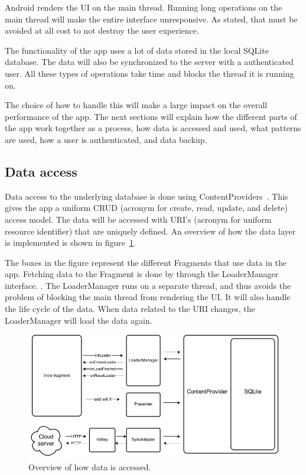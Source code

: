 Android renders the UI on the main thread. Running long operations on the main thread will make the entire interface unresponsive. As stated, that must be avoided at all cost to not destroy the user experience. 

The functionality of the app uses a lot of data stored in the local SQLite database. The data will also be synchronized to the server with a authenticated user. All these types of operations take time and blocks the thread it is running on.

The choice of how to handle this will make a large impact on the overall performance of the app. The next sections will explain how the different parts of the app work together as a process, how data is accessed and used, what patterns are used, how a user is authenticated, and data backup.


\subsection{Data access}
Data access to the underlying database is done using ContentProviders~\cite{contentproviders}. This gives the app a uniform \gls{CRUD} (acronym for create, read, update, and delete) access model. The data will be accessed with \gls{URI}'s (acronym for uniform resource identifier) that are uniquely defined. An overview of how the data layer is implemented is shown in figure~\ref{fig:archAppOverview}.

The boxes in the figure represent the different Fragments that use data in the app. Fetching data to the Fragment is done by through the LoaderManager~\cite{loadermanager} interface. . The LoaderManager runs on a separate thread, and thus avoids the problem of blocking the main thread from rendering the UI. It will also handle the life cycle of the data. When data related to the URI changes, the LoaderManager will load the data again. 

\begin{figure}[H]
\includegraphics[width=\textwidth]{ch/architecture/fig/arch_app_overview.png}
\caption{Overview of how data is accessed.}
\label{fig:archAppOverview}
\end{figure}

